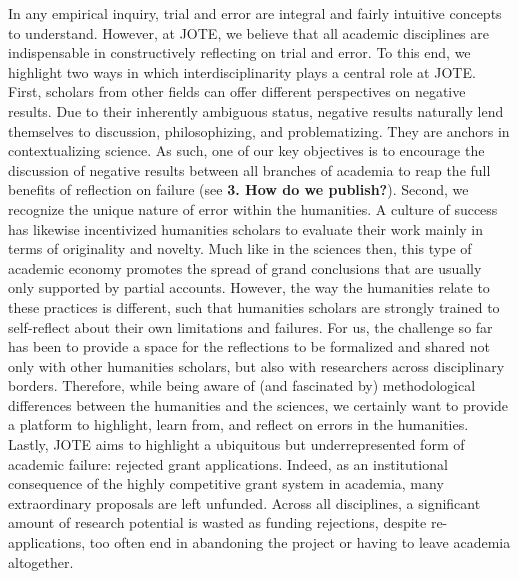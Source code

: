 \documentclass[twocolumn, serif]{jote-article}
\begin{document}
{{{{In any empirical inquiry, trial and error are integral and fairly intuitive concepts to understand. However, at JOTE, we believe that all academic disciplines are indispensable in constructively reflecting on trial and error. To this end, we highlight two ways in which interdisciplinarity plays a central role at JOTE. First, scholars from other fields can offer different perspectives on negative results. Due to their inherently ambiguous status, negative results naturally lend themselves to discussion, philosophizing, and problematizing. They are anchors in contextualizing science. As such, one of our key objectives is to encourage the discussion of negative results between all branches of academia to reap the full benefits of reflection on failure (see \textbf{3. How do we publish?}). Second, we recognize the unique nature of error within the humanities. A culture of success has likewise incentivized humanities scholars to evaluate their work mainly in terms of originality and novelty. Much like in the sciences then, this type of academic economy promotes the spread of grand conclusions that are usually only supported by partial accounts. However, the way the humanities relate to these practices is different, such that humanities scholars are strongly trained to self-reflect about their own limitations and failures. For us, the challenge so far has been to provide a space for the reflections to be formalized and shared not only with other humanities scholars, but also with researchers across disciplinary borders. Therefore, while being aware of (and fascinated by) methodological differences between the humanities and the sciences, we certainly want to provide a platform to highlight, learn from, and reflect on errors in the humanities. Lastly, JOTE aims to highlight a ubiquitous but underrepresented form of academic failure: rejected grant applications. Indeed, as an institutional consequence of the highly competitive grant system in academia, many extraordinary proposals are left unfunded. Across all disciplines, a significant amount of research potential is wasted as funding rejections, despite re-applications, too often end in abandoning the project or having to leave academia altogether.

\hypertarget{why-do-we-want-to-publish-trial-and-error}{%

}}}}}
\end{document}
